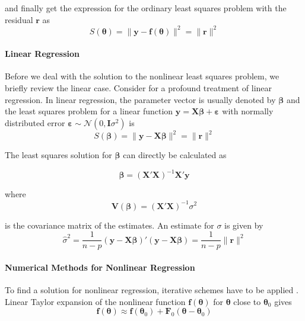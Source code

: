 and finally get the expression for the ordinary least squares problem with the residual $\mathbf{r}$ as
\begin{equation}
\label{eq:cost_ols}
S(\boldsymbol{\theta}) = \| \mathbf{y} - \mathbf{f}(\boldsymbol{\theta}) \|^2 = \| \mathbf{r} \|^2
\end{equation}

\paragraph{Linear Regression\\}
Before we deal with the solution to the nonlinear least squares problem, we briefly review the linear case. Consider \citet[chap. 5]{Draper} for a profound treatment of linear regression.
In linear regression, the parameter vector is usually denoted by $\boldsymbol{\beta}$ and the least squares problem for a linear function 
$\mathbf{y} = \mathbf{X} \boldsymbol{\beta} + \boldsymbol{\varepsilon}$ 
with normally distributed error 
$\boldsymbol{\varepsilon} \sim \mathcal{N}(0,\mathbf{I} \sigma^2)$ 
is
\begin{equation}
S(\boldsymbol{\beta}) = \| \mathbf{y} - \mathbf{X}\boldsymbol{\beta} \|^2 = \| \mathbf{r} \|^2
\end{equation}

The least squares solution for $\boldsymbol{\beta}$ can directly be calculated as

\begin{equation}
\label{eq:linear_ls_solution}
\boldsymbol{\beta} = (\mathbf{X}' \mathbf{X})^{-1} \mathbf{X}' \mathbf{y}
\end{equation}

where
\begin{equation}
\label{eq:linear_ls_covariance}
\mathbf{V} (\boldsymbol{\beta}) = (\mathbf{X}' \mathbf{X})^{-1} {\sigma}^2
\end{equation}

is the covariance matrix of the estimates. An estimate for ${\sigma}$ is given by
\begin{equation}
\hat{\sigma}^2
= \frac{1}{n-p} (\mathbf{y} - \mathbf{X} \boldsymbol{\beta})' (\mathbf{y} - \mathbf{X} \boldsymbol{\beta})
= \frac{1}{n-p} \| \mathbf{r} \|^2
\end{equation}

\paragraph{Numerical Methods for Nonlinear Regression\\}
To find a solution for nonlinear regression, iterative schemes have to be applied \citep{Seber}.
Linear Taylor expansion of the nonlinear function
$\mathbf{f}(\boldsymbol{\theta})$ 
for 
$\boldsymbol{\theta}$
close to 
$\boldsymbol{\theta}_0$
gives
\begin{equation}
\label{eq:linearized_f}
\mathbf{f}(\boldsymbol{\theta}) \approx
\mathbf{f}(\boldsymbol{\theta}_0) + \mathbf{F}_0(\boldsymbol{\theta} - \boldsymbol{\theta}_0)
\end{equation}

